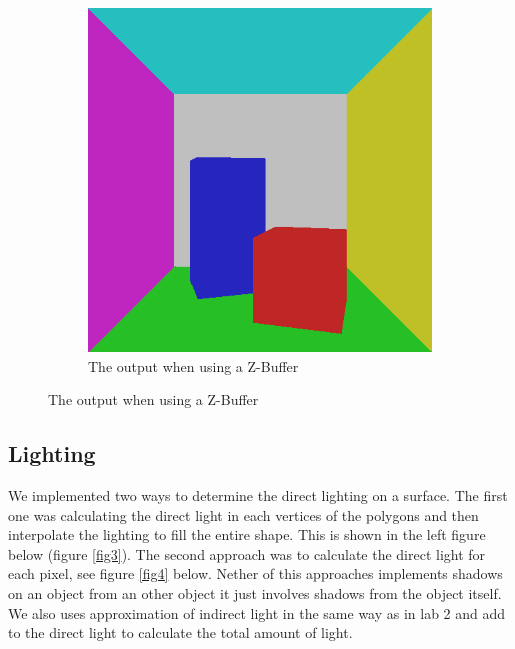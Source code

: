 \documentclass[a4paper,11pt]{article}
\begin{document}
\begin{figure}[h!]
\begin{subfigure}[h!]{0.4\linewidth}
		\includegraphics[width=\linewidth]{screenshot2.png}
		\caption{The output when using a Z-Buffer}
		\label{fig2}
	\end{subfigure}
\end{figure}

\clearpage
\subsection{Lighting}
We implemented two ways to determine the direct lighting on a surface. The first one was calculating the direct light in each vertices of the polygons and then interpolate the lighting to fill the entire shape. This is shown in the left figure below (figure \ref{fig3}). The second approach was to calculate the direct light for each pixel, see figure \ref{fig4} below. Nether of this approaches implements shadows on an object from an other object it just involves shadows from the object itself. We also uses approximation of indirect light in the same way as in lab 2 and add to the direct light to calculate the total amount of light.
\end{document}
